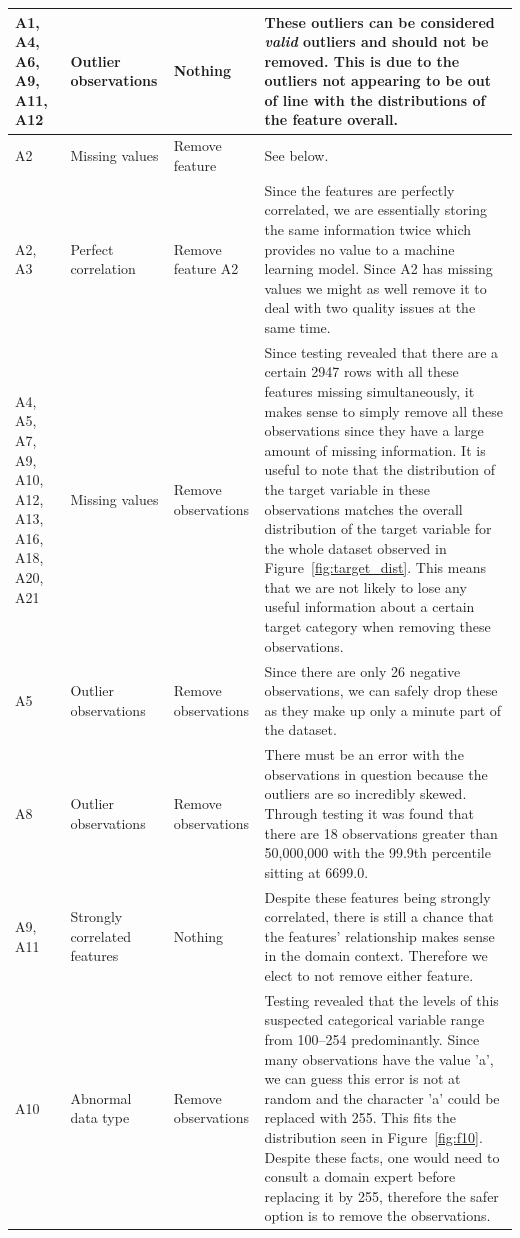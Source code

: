 \documentclass[11pt]{article}
\begin{document}
\begin{longtable}{|p{1.7cm}|p{4cm}|p{3cm}|p{6cm}|}
	\hline
	\endlastfoot
	A1, A4, A6, A9, A11, A12 & Outlier observations & Nothing & These outliers can be considered \textit{valid} outliers and should not be removed. This is due to the outliers not appearing to be out of line with the distributions of the feature overall.\\ \hline
	A2 & Missing values & Remove feature & See below. \\ \hline
	A2, A3 & Perfect correlation & Remove feature A2 & Since the features are perfectly correlated, we are essentially storing the same information twice which provides no value to a machine learning model. Since A2 has missing values we might as well remove it to deal with two quality issues at the same time. \\ \hline
	A4, A5, A7, A9, A10, A12, A13, A16, A18, A20, A21 & Missing values & Remove observations & Since testing revealed that there are a certain 2947 rows with all these features missing simultaneously, it makes sense to simply remove all these observations since they have a large amount of missing information. It is useful to note that the distribution of the target variable in these observations matches the overall distribution of the target variable for the whole dataset observed in Figure~\ref{fig:target_dist}. This means that we are not likely to lose any useful information about a certain target category when removing these observations.  \\ \hline
	A5 & Outlier observations & Remove observations & Since there are only 26 negative observations, we can safely drop these as they make up only a minute part of the dataset. \\
	\hline
	A8 & Outlier observations & Remove observations & There must be an error with the observations in question because the outliers are so incredibly skewed. Through testing it was found that there are 18 observations greater than 50,000,000 with the 99.9th percentile sitting at 6699.0. \\ \hline
	A9, A11 & Strongly correlated features & Nothing & Despite these features being strongly correlated, there is still a chance that the features' relationship makes sense in the domain context. Therefore we elect to not remove either feature.\\ \hline
	A10 & Abnormal data type & Remove observations & Testing revealed that the levels of this suspected categorical variable range from 100–254 predominantly. Since many observations have the value 'a', we can guess this error is not at random and the character 'a' could be replaced with 255. This fits the distribution seen in Figure~\ref{fig:f10}. Despite these facts, one would need to consult a domain expert before replacing it by 255, therefore the safer option is to remove the observations. \\ \hline

\end{longtable}
\end{document}
